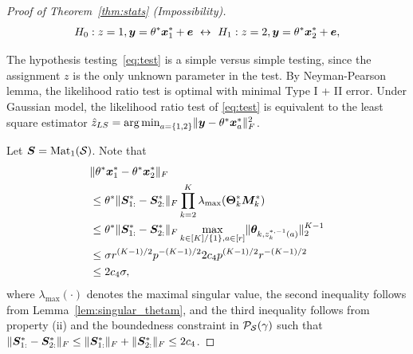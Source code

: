 \documentclass[journal]{IEEEtran}
\theoremstyle{definition}
\theoremstyle{definition}
\begin{document}
\begin{proof}[Proof of Theorem~\ref{thm:stats} (Impossibility)]
\vspace{-0.5cm}
\small
\begin{equation}\label{eq:test}
 H_0: z = 1, \my = \theta^* \mx_1^* + \me \  \leftrightarrow \  H_1: z = 2, \my = \theta^* \mx_2^* + \me,
\end{equation}
\normalsize
   
   The hypothesis testing~\eqref{eq:test} is a simple versus simple testing, since the assignment $z$ is the only unknown parameter in the test. 
   By Neyman-Pearson lemma, the likelihood ratio test is optimal with minimal Type I + II error. Under Gaussian model, the likelihood ratio test of \eqref{eq:test} is equivalent to the least square estimator $\hat z_{LS} = \operatorname*{arg\,min}_{a = \{1,2\}} \lVert\bm{y} - \theta^* \bm x_a^*\rVert_F^2$. 
   
   Let $\bm S = \text{Mat}_1(\mathcal{S})$. Note that 
   \begin{align}
       &\onormSize{}{ \theta^* \mx_1^*  - \theta^* \mx_2^*}_F\\
       &\leq  \theta^* \onormSize{}{ \mS^*_{1:} - \mS^*_{2:} }_F \prod_{k = 2}^K \lambda_{\max}(\mTheta_k^*\mM_k^*)  \\
       & \leq \theta^* \onormSize{}{ \mS^*_{1:} - \mS^*_{2:} }_F   \max_{k \in [K]/\{1\}, a \in [r]} \onormSize{}{\mtheta_{k, z^{*, -1}_k(a)}}_2^{K-1} \\
       & \leq  \sigma r^{(K-1)/2} p^{-(K-1)/2} 2 c_4 p^{(K-1)/2} r^{-(K-1)/2}\\
       & \leq 2 c_4 \sigma, \label{eq:bound}
   \end{align}
   where $\lambda_{\max}(\cdot)$ denotes the maximal singular value, the second inequality follows from Lemma~\ref{lem:singular_thetam}, and the third inequality follows from property (ii) and the boundedness constraint in $\mathcal{P}_{\mathcal{S}}(\gamma)$ such that $\lVert \bm S^*_{1:} - \bm S^*_{2:} \rVert_F  \leq \lVert\bm S_{1:}^*\rVert_F + \lVert\bm S_{2:}^*\rVert_F \leq 2c_4$.


\end{proof}
\end{document}
